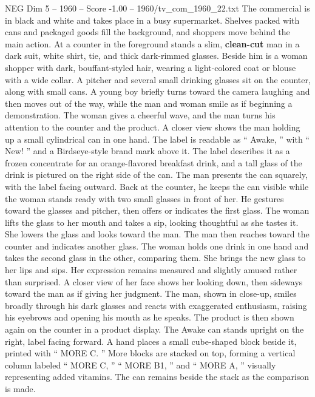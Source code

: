 \begin{textsample}{NEG Dim 5 – 1960 – Score -1.00 – 1960/tv\_com\_1960\_22.txt}  \label{ex:f5_neg_045}
The commercial is in black and white and takes place in a busy supermarket.
Shelves packed with cans and packaged goods fill the background, and shoppers move behind the main action.
At a counter in the foreground stands a slim, \textbf{clean-cut} man in a dark suit, white shirt, tie, and thick dark-rimmed glasses.
Beside him is a woman shopper with dark, bouffant-styled hair, wearing a light-colored coat or blouse with a wide collar.
A pitcher and several small drinking glasses sit on the counter, along with small cans.
A young boy briefly turns toward the camera laughing and then moves out of the way, while the man and woman smile as if beginning a demonstration.
The woman gives a cheerful wave, and the man turns his attention to the counter and the product.
A closer view shows the man holding up a small cylindrical can in one hand.
The label is readable as “ Awake, ” with “ New! ” and a Birdseye-style brand mark above it.
The label describes it as a frozen concentrate for an orange-flavored breakfast drink, and a tall glass of the drink is pictured on the right side of the can.
The man presents the can squarely, with the label facing outward.
Back at the counter, he keeps the can visible while the woman stands ready with two small glasses in front of her.
He gestures toward the glasses and pitcher, then offers or indicates the first glass.
The woman lifts the glass to her mouth and takes a sip, looking thoughtful as she tastes it.
She lowers the glass and looks toward the man.
The man then reaches toward the counter and indicates another glass.
The woman holds one drink in one hand and takes the second glass in the other, comparing them.
She brings the new glass to her lips and sips.
Her expression remains measured and slightly amused rather than surprised.
A closer view of her face shows her looking down, then sideways toward the man as if giving her judgment.
The man, shown in close-up, smiles broadly through his dark glasses and reacts with exaggerated enthusiasm, raising his eyebrows and opening his mouth as he speaks.
The product is then shown again on the counter in a product display.
The Awake can stands upright on the right, label facing forward.
A hand places a small cube-shaped block beside it, printed with “ MORE C. ” More blocks are stacked on top, forming a vertical column labeled “ MORE C, ” “ MORE B1, ” and “ MORE A, ” visually representing added vitamins.
The can remains beside the stack as the comparison is made.

\end{textsample}
